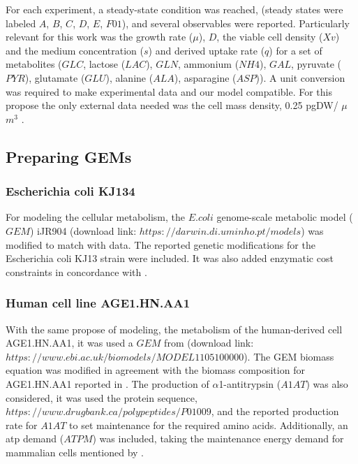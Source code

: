 \documentclass[]{article}
\begin{document}
	For each experiment, a steady-state condition was reached, (steady states were labeled $A$, $B$, $C$, $D$, $E$, $F01$), and several observables were reported. Particularly relevant for this work was the growth rate ($\mu$), $D$, the viable cell density ($Xv$) and the medium concentration ($s$) and derived uptake rate ($q$) for a set of metabolites ($GLC$, lactose ($LAC$), $GLN$, ammonium ($NH4$), $GAL$, pyruvate ($PYR$), glutamate ($GLU$), alanine ($ALA$), asparagine ($ASP$)). A unit conversion was required to make experimental data and our model compatible. For this propose the only external data needed was the cell mass density, 0.25 pgDW/ $\mu$$m^3$ .
	
	
	\subsection{Preparing GEMs} 
	
	\subsubsection{Escherichia coli KJ134}
	For modeling the cellular metabolism, the $E. coli$ genome-scale metabolic model ($GEM$) iJR904  (download link: $https://darwin.di.uminho.pt/models$) was modified to match with  data. The reported genetic modifications for the Escherichia coli KJ13 strain were included. It was also added enzymatic cost constraints in concordance with .
	
	
	\subsubsection{Human cell line AGE1.HN.AA1}
	With the same propose of modeling, the metabolism of the human-derived cell AGE1.HN.AA1, it was used a $GEM$ from (download link: $https://www.ebi.ac.uk/biomodels/MODEL1105100000$). The GEM biomass equation was modified in agreement with the biomass composition for AGE1.HN.AA1 reported in . The production of $\alpha$1-antitrypsin ($A1AT$) was also considered, it was used the protein sequence, $https://www.drugbank.ca/polypeptides/P01009$, and the reported production rate for $A1AT$  to set maintenance for the required amino acids. Additionally, an atp demand ($ATPM$) was included, taking the maintenance energy demand for mammalian cells mentioned by  .
		
\end{document}
